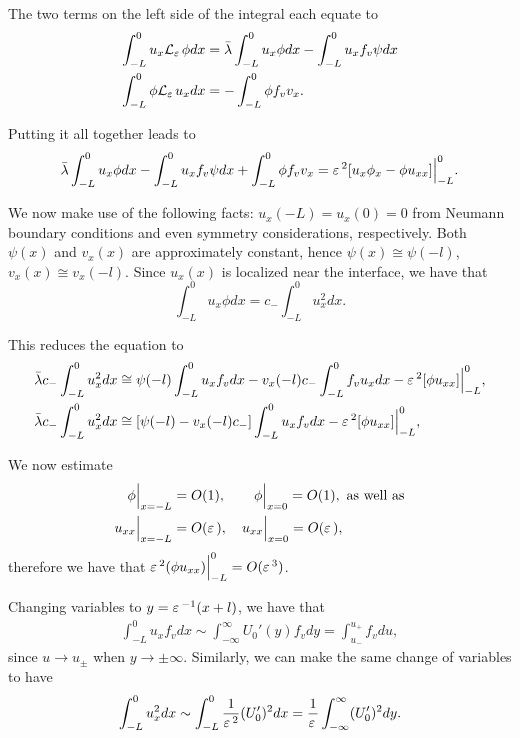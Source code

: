 The two terms on the left side of the integral each equate to
% 
\begin{equation*}
\begin{split}
	\int_{-L}^0u_x\mathcal{L}_{\varepsilon\,}\phi dx &= \bar{\lambda}\int_{-L}^0u_x\phi dx - \int_{-L}^0u_xf_v\psi dx\\
	\int_{-L}^0\phi\mathcal{L}_{\varepsilon\,}u_x dx &= -\int_{-L}^0\phi f_vv_x.
\end{split}
\end{equation*}
% 

Putting it all together leads to 
% 
\[
  \bar{\lambda}\int_{-L}^0u_x\phi dx - \int_{-L}^0u_xf_v\psi dx + \int_{-L}^0\phi f_vv_x = \Big.\varepsilon\,^2[u_x\phi_x-\phi u_{xx}]\Big|_{-L}^0.
\]
% 

We now make use of the following facts: $u_x(-L)=u_x(0)=0$ from Neumann boundary conditions and even symmetry considerations, respectively. Both $\psi(x)$ and $v_x(x)$ are approximately constant, hence $\psi(x)\cong \psi(-l)$, $v_x(x)\cong v_x(-l)$. Since $u_x(x)$ is localized near the interface, we have that 
% 
\[
  \int_{-L}^0u_x\phi dx = c_-\int_{-L}^0u_x^2dx.
\]
% 

This reduces the equation to
% 
\begin{equation*}
\begin{split}
	\bar{\lambda}c_-\int_{-L}^0u_x^2 dx &\cong \psi(-l)\int_{-L}^0u_xf_vdx - v_x(-l)c_-\int_{-L}^0f_vu_xdx - \Big.\varepsilon\,^2[\phi u_{xx}]\Big|_{-L}^0,\\
	\bar{\lambda}c_-\int_{-L}^0u_x^2 dx &\cong \left[\psi(-l) - v_x(-l)c_-\right]\int_{-L}^0u_xf_vdx - \Big.\varepsilon\,^2[\phi u_{xx}]\Big|_{-L}^0,
\end{split}
\end{equation*}
% 

We now estimate 
% 
\begin{equation*}
\begin{split}
\begin{aligned}
\Big.\phi \Big|_{x=-L} &= O(1),\qquad \Big.\phi \Big|_{x=0} = O(1), \text{ as well as} \\
\Big.u_{xx} \Big|_{x=-L} &= O(\varepsilon\,), \quad\Big.u_{xx} \Big|_{x=0} = O(\varepsilon\,),
\end{aligned}
\end{split}
\end{equation*}
% 
therefore we have that $\Big.\varepsilon\,^2(\phi u_{xx})\Big|_{-L}^0 = O(\varepsilon\,^3)$.

Changing variables to $y = \varepsilon\,^{-1}(x+l)$, we have that
% 
\begin{equation*}
\begin{split}
	\int_{-L}^0u_xf_vdx\sim \int_{-\infty}^{\infty}U_0'(y)f_vdy = \int_{u_-}^{u_+}f_vdu,
\end{split}
\end{equation*}
% 
since $u\rightarrow u_{\pm}$ when $y\rightarrow\pm\infty$. Similarly, we can make the same change of variables to have
% 
\begin{equation*}
\begin{split}
	\int_{-L}^0u_x^2dx\sim \int_{-L}^{0}\frac{1}{\varepsilon\,^2}(U_0')^2dx = \frac{1}{\varepsilon\,}\int_{-\infty}^{\infty}(U_0')^2dy.
\end{split}
\end{equation*}
% 

